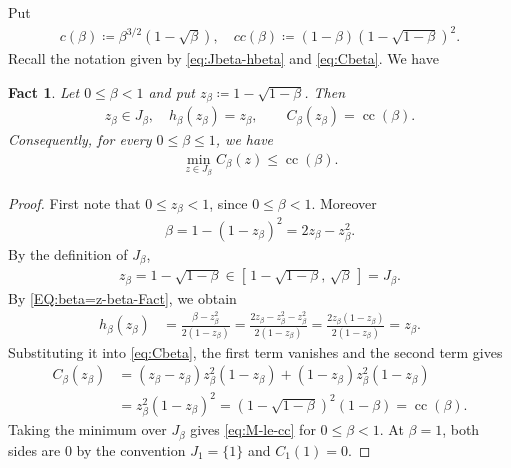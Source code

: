 \documentclass[10pt,a4paper]{article}
\newtheorem{fact}[definition]{Fact}
\newcommand{\cc}{\operatorname{cc}}
\begin{document}
Put 
\begin{align*}
    c(\beta) \coloneqq \beta^{3/2}(1 -\sqrt \beta),\quad %
cc(\beta) \coloneqq (1 -\beta)(1-\sqrt{1-\beta})^2.
\end{align*}
Recall the notation  given by  \eqref{eq:Jbeta-hbeta} and \eqref{eq:Cbeta}. We have 
\begin{fact}\label{fact:qs-endpoint}
Let
$0\le\beta<1$ and put $z_\beta\coloneqq1-\sqrt{1-\beta}$.  Then 
\begin{align*}
  z_\beta\in J_\beta, \quad h_\beta(z_\beta)=z_\beta,
  \qquad
  C_\beta(z_\beta)=\cc(\beta).
\end{align*}
Consequently, for every $0\le\beta\le1$, we have
\begin{align}\label{eq:M-le-cc}
  \min_{z\in J_\beta} C_\beta(z)\le\cc(\beta).
\end{align}
\end{fact}




\begin{proof}
First note that $0\le z_\beta<1$, since $0\le\beta<1$.  Moreover
\begin{align}\label{EQ:beta=z-beta-Fact}
  \beta=1-(1-z_\beta)^2=2z_\beta-z_\beta^2.
\end{align}
By the definition of $J_\beta$,
\begin{align*}
  z_\beta=1-\sqrt{1-\beta}\in
  [\,1-\sqrt{1-\beta},\,\sqrt\beta\,]=J_\beta .
\end{align*}
By \eqref{EQ:beta=z-beta-Fact}, we obtain
\begin{align*}
  h_\beta(z_\beta)
  &=\frac{\beta-z_\beta^2}{2(1-z_\beta)}
    =\frac{2z_\beta-z_\beta^2-z_\beta^2}{2(1-z_\beta)}
    =\frac{2z_\beta(1-z_\beta)}{2(1-z_\beta)}
    =z_\beta.
\end{align*}
Substituting it into \eqref{eq:Cbeta}, the first
term vanishes and the second term gives
\begin{align*}
  C_\beta(z_\beta)
  &=(z_\beta-z_\beta)z_\beta^2(1-z_\beta)
    +(1-z_\beta)z_\beta^2(1-z_\beta)\\
  &=z_\beta^2(1-z_\beta)^2
  =(1-\sqrt{1-\beta})^2(1-\beta)
  =\cc(\beta).
\end{align*}
Taking the minimum over $J_\beta$ gives \eqref{eq:M-le-cc} for
$0\le\beta<1$.  At $\beta=1$, both sides are $0$ by the convention
$J_1=\{1\}$ and $C_1(1)=0$.
\end{proof}
\end{document}

